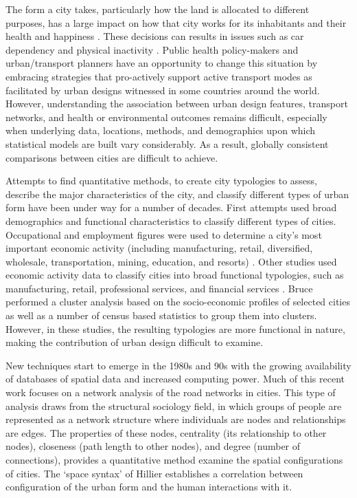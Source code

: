\documentclass[10pt,letterpaper,hidelinks]{article}
\begin{document}
The form a city takes, particularly how the land is allocated to different purposes, has a large impact on how that city works for its inhabitants and their health and happiness \cite{Giles-corti2016,Kleinert2016,Goenka2016,Zapata-Diomedi2017}. These decisions can results in issues such as car dependency \cite{Heesch2014,Daley2011} and physical inactivity \cite{Cepeda2016,MingWen2008,Norman2006}. Public health policy-makers and urban/transport planners have an opportunity to change this situation by embracing strategies that pro-actively support active transport modes as facilitated by urban designs witnessed in some countries around the world. However, understanding the association between urban design features, transport networks, and health or environmental outcomes remains difficult, especially when underlying data, locations, methods, and demographics upon which statistical models are built vary considerably. As a result, globally consistent comparisons between cities are difficult to achieve. 

Attempts to find quantitative methods, to create city typologies to assess, describe the major characteristics of the city, and classify different types of urban form have been under way for a number of decades. First attempts used broad demographics and functional characteristics to classify different types of cities. Occupational and employment figures were used to determine a city's most important economic activity (including manufacturing, retail, diversified, wholesale, transportation, mining, education, and resorts) \cite{Harris1943}. Other studies used economic activity data to classify cities into broad functional typologies, such as manufacturing, retail, professional services, and financial services \cite{Nelson1955}. Bruce \cite{Bruce1971} performed a cluster analysis based on the socio-economic profiles of selected cities as well as a number of census based statistics to group them into clusters. However, in these studies, the resulting typologies are more functional in nature, making the contribution of urban design difficult to examine.

New techniques start to emerge in the 1980s and 90s with the growing availability of databases of spatial data and increased computing power. Much of this recent work focuses on a network analysis of the road networks in cities. This type of analysis draws from the structural sociology field, in which groups of people are represented as a network structure where individuals are nodes and relationships are edges. The properties of these nodes, centrality (its relationship to other nodes), closeness (path length to other nodes), and degree (number of connections), provides a quantitative method examine the spatial configurations of cities. The `space syntax' of Hillier \cite{Hillier1996} establishes a correlation between configuration of the urban form and the human interactions with it. 
\end{document}
